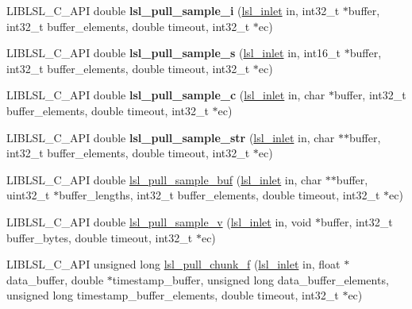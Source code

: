 \begin{DoxyCompactItemize}
L\+I\+B\+L\+S\+L\+\_\+\+C\+\_\+\+A\+PI double {\bfseries lsl\+\_\+pull\+\_\+sample\+\_\+i} (\hyperlink{namespacelsl_a884a3363cfcba75d7ce8f00c1c4c54f1}{lsl\+\_\+inlet} in, int32\+\_\+t $\ast$buffer, int32\+\_\+t buffer\+\_\+elements, double timeout, int32\+\_\+t $\ast$ec)
\item 
\mbox{\label{namespacelsl_a9c1676b5e509980eeb5065a2c84144c4}} 
L\+I\+B\+L\+S\+L\+\_\+\+C\+\_\+\+A\+PI double {\bfseries lsl\+\_\+pull\+\_\+sample\+\_\+s} (\hyperlink{namespacelsl_a884a3363cfcba75d7ce8f00c1c4c54f1}{lsl\+\_\+inlet} in, int16\+\_\+t $\ast$buffer, int32\+\_\+t buffer\+\_\+elements, double timeout, int32\+\_\+t $\ast$ec)
\item 
\mbox{\label{namespacelsl_aaa7da3f1fd36b31afafbfaf5eac09fbb}} 
L\+I\+B\+L\+S\+L\+\_\+\+C\+\_\+\+A\+PI double {\bfseries lsl\+\_\+pull\+\_\+sample\+\_\+c} (\hyperlink{namespacelsl_a884a3363cfcba75d7ce8f00c1c4c54f1}{lsl\+\_\+inlet} in, char $\ast$buffer, int32\+\_\+t buffer\+\_\+elements, double timeout, int32\+\_\+t $\ast$ec)
\item 
\mbox{\label{namespacelsl_a3fd4085148eab55ea6a918dc151869a3}} 
L\+I\+B\+L\+S\+L\+\_\+\+C\+\_\+\+A\+PI double {\bfseries lsl\+\_\+pull\+\_\+sample\+\_\+str} (\hyperlink{namespacelsl_a884a3363cfcba75d7ce8f00c1c4c54f1}{lsl\+\_\+inlet} in, char $\ast$$\ast$buffer, int32\+\_\+t buffer\+\_\+elements, double timeout, int32\+\_\+t $\ast$ec)
\item 
L\+I\+B\+L\+S\+L\+\_\+\+C\+\_\+\+A\+PI double \hyperlink{namespacelsl_aeb6a1e871e465e4859292bc46a2e5bbd}{lsl\+\_\+pull\+\_\+sample\+\_\+buf} (\hyperlink{namespacelsl_a884a3363cfcba75d7ce8f00c1c4c54f1}{lsl\+\_\+inlet} in, char $\ast$$\ast$buffer, uint32\+\_\+t $\ast$buffer\+\_\+lengths, int32\+\_\+t buffer\+\_\+elements, double timeout, int32\+\_\+t $\ast$ec)
\item 
L\+I\+B\+L\+S\+L\+\_\+\+C\+\_\+\+A\+PI double \hyperlink{namespacelsl_a4b9141b42af68f2224c1f72044bf6018}{lsl\+\_\+pull\+\_\+sample\+\_\+v} (\hyperlink{namespacelsl_a884a3363cfcba75d7ce8f00c1c4c54f1}{lsl\+\_\+inlet} in, void $\ast$buffer, int32\+\_\+t buffer\+\_\+bytes, double timeout, int32\+\_\+t $\ast$ec)
\item 
L\+I\+B\+L\+S\+L\+\_\+\+C\+\_\+\+A\+PI unsigned long \hyperlink{namespacelsl_a59b21970f29b294c8d4d43be06335cba}{lsl\+\_\+pull\+\_\+chunk\+\_\+f} (\hyperlink{namespacelsl_a884a3363cfcba75d7ce8f00c1c4c54f1}{lsl\+\_\+inlet} in, float $\ast$data\+\_\+buffer, double $\ast$timestamp\+\_\+buffer, unsigned long data\+\_\+buffer\+\_\+elements, unsigned long timestamp\+\_\+buffer\+\_\+elements, double timeout, int32\+\_\+t $\ast$ec)

\end{DoxyCompactItemize}
